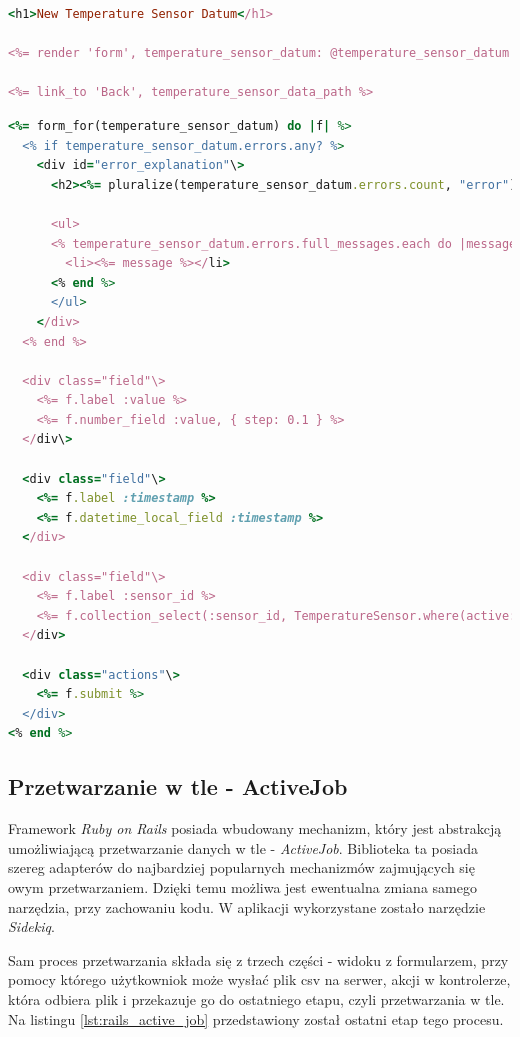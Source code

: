 \begin{lstlisting}[caption={Widok, na którym można dodać nowe próbki dla sensora temperatury.},label={lst:rails_sensor_data_view},language=Ruby]
<h1>New Temperature Sensor Datum</h1>

<%= render 'form', temperature_sensor_datum: @temperature_sensor_datum %>

<%= link_to 'Back', temperature_sensor_data_path %>
\end{lstlisting}

\begin{lstlisting}[caption={Fragment, na którym jest formularz.},label={lst:rails_sensor_form_partial},language=Ruby]
<%= form_for(temperature_sensor_datum) do |f| %>
  <% if temperature_sensor_datum.errors.any? %>
    <div id="error_explanation"\>
      <h2><%= pluralize(temperature_sensor_datum.errors.count, "error") %> prohibited this temperature_sensor_datum from being saved:</h2>

      <ul>
      <% temperature_sensor_datum.errors.full_messages.each do |message| %>
        <li><%= message %></li>
      <% end %>
      </ul>
    </div>
  <% end %>

  <div class="field"\>
    <%= f.label :value %>
    <%= f.number_field :value, { step: 0.1 } %>
  </div\>

  <div class="field"\>
    <%= f.label :timestamp %>
    <%= f.datetime_local_field :timestamp %>
  </div>

  <div class="field"\>
    <%= f.label :sensor_id %>
    <%= f.collection_select(:sensor_id, TemperatureSensor.where(active: true), :id, :name) %>
  </div>

  <div class="actions"\>
    <%= f.submit %>
  </div>
<% end %>
\end{lstlisting}

\subsection{Przetwarzanie w tle - ActiveJob}
Framework \emph{Ruby on Rails} posiada wbudowany mechanizm, który jest abstrakcją umożliwiającą przetwarzanie danych w tle - \emph{ActiveJob}. Biblioteka ta posiada szereg adapterów do najbardziej popularnych mechanizmów zajmujących się owym przetwarzaniem. Dzięki temu możliwa jest ewentualna zmiana samego narzędzia, przy zachowaniu kodu. W aplikacji wykorzystane zostało narzędzie \emph{Sidekiq}.

Sam proces przetwarzania składa się z trzech części - widoku z formularzem, przy pomocy którego użytkowniok może wysłać plik csv na serwer, akcji w kontrolerze, która odbiera plik i przekazuje go do ostatniego etapu, czyli przetwarzania w tle. Na listingu \ref{lst:rails_active_job} przedstawiony został ostatni etap tego procesu.

